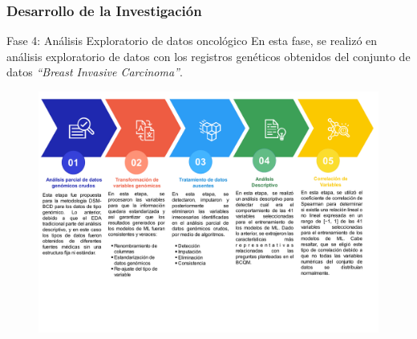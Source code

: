 \documentclass[xcolor=dvipsnames,xcolor=table,10pt]{beamer} %
\begin{document}
\begin{frame}
	\frametitle{Desarrollo de la Investigación}
	\begin{block}{Fase 4: Análisis Exploratorio de datos oncológico}\justifying
		En esta fase, se realizó en análisis exploratorio de datos con los registros genéticos obtenidos del conjunto de datos \textit{“Breast Invasive Carcinoma”}.
	\end{block}
	
	\begin{figure}[h!]
		\centering
		\includegraphics[width=0.87\linewidth]{IMAGENES/EDA_Beamer}
	\end{figure}
	
\end{frame}
\end{document}
